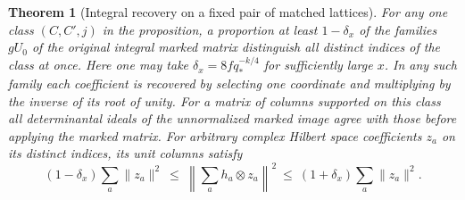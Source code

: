 \documentclass[a4paper,11pt]{article}
\newtheorem{theorem}[proposition]{Theorem}
\theoremstyle{definition}
\theoremstyle{remark}
\numberwithin{equation}{section}
\begin{document}
\begin{theorem}[Integral recovery on a fixed pair of matched lattices]
\leavevmode\label{thm:matchedcoordinates631}
For any one class \((C,C',j)\) in the proposition, a proportion at
least \(1-\delta_x\) of the families \(gU_0\) of the original
integral marked matrix distinguish \emph{all} distinct indices of
the class at once. Here one may take
\(\delta_x=8f q_*^{-k/4}\) for sufficiently large \(x\).
In any such family each coefficient is recovered by selecting one
coordinate and multiplying by the inverse of its root of unity.
For a matrix of columns supported on this class all determinantal
ideals of the unnormalized marked image agree with those before
applying the marked matrix. For arbitrary complex Hilbert space
coefficients \(z_a\) on its distinct indices, its unit columns satisfy
\[
 (1-\delta_x)\sum_a\|z_a\|^2
 \ \le\ \left\|\sum_a h_a\otimes z_a\right\|^2
 \ \le\ (1+\delta_x)\sum_a\|z_a\|^2 .
\]
\end{theorem}
\end{document}

